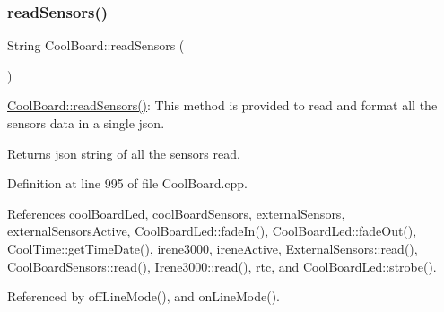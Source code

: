 \subsubsection{\texorpdfstring{read\+Sensors()}{readSensors()}}
{\footnotesize\ttfamily String Cool\+Board\+::read\+Sensors (\begin{DoxyParamCaption}{ }\end{DoxyParamCaption})}

\hyperlink{classCoolBoard_ad03abdce2e65f520bbf2cff0f2d083cf}{Cool\+Board\+::read\+Sensors()}\+: This method is provided to read and format all the sensors data in a single json.

\begin{DoxyReturn}{Returns}
json string of all the sensors read. 
\end{DoxyReturn}


Definition at line 995 of file Cool\+Board.\+cpp.



References cool\+Board\+Led, cool\+Board\+Sensors, external\+Sensors, external\+Sensors\+Active, Cool\+Board\+Led\+::fade\+In(), Cool\+Board\+Led\+::fade\+Out(), Cool\+Time\+::get\+Time\+Date(), irene3000, irene\+Active, External\+Sensors\+::read(), Cool\+Board\+Sensors\+::read(), Irene3000\+::read(), rtc, and Cool\+Board\+Led\+::strobe().



Referenced by off\+Line\+Mode(), and on\+Line\+Mode().


